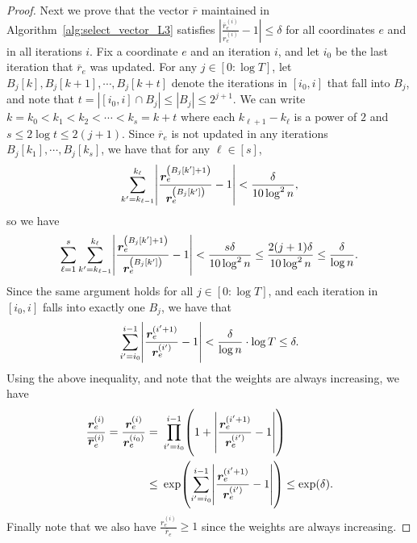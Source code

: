 \documentclass[11pt]{article}
\let\originalleft\left
\let\originalright\right
\renewcommand{\left}{\mathopen{}\mathclose\bgroup\originalleft}
\renewcommand{\right}{\aftergroup\egroup\originalright}
\newcommand\rr{\boldsymbol{\mathit{r}}}
\newcommand\rrbar{\overline{\boldsymbol{\mathit{r}}}}
\begin{document}
\begin{proof}
Next we prove that the vector $\rrbar$ maintained in Algorithm~\ref{alg:select_vector_L3} satisfies $|\frac{\rrbar^{(i)}_e}{\rr_e^{(i)}} - 1| \leq \delta$ for all coordinates $e$ and in all iterations $i$. Fix a coordinate $e$ and an iteration $i$, and let $i_0$ be the last iteration that $\rrbar_e$ was updated. For any $j \in [0:\log T]$, let $B_j[k], B_j[k+1], \cdots, B_j[k+t]$ denote the iterations in $[i_0, i]$ that fall into $B_j$, and note that $t = |[i_0,i] \cap B_j| \leq |B_j| \leq 2^{j+1}$. We can write $k = k_0 < k_1 < k_2 < \cdots < k_s = k+t$ where each $k_{\ell+1} - k_{\ell}$ is a power of $2$ and $s \leq 2 \log t \leq 2 (j+1)$. Since $\rrbar_e$ is not updated in any iterations $B_j[k_1], \cdots, B_j[k_s]$, we have that for any $\ell \in [s]$,
\begin{align*}
\sum_{k' = k_{\ell-1}}^{k_{\ell}} \left|\frac{\rr_e^{\left(B_j[k'] + 1\right)}}{\rr_e^{\left(B_j[k'] \right)}} - 1 \right| < \frac{\delta}{10 \log^2 n},
\end{align*}
so we have
\begin{align*}
\sum_{\ell=1}^{s} \sum_{k' = k_{\ell-1}}^{k_{\ell}} \left|\frac{\rr_e^{\left(B_j[k'] + 1\right)}}{\rr_e^{\left(B_j[k'] \right)}} - 1 \right| < \frac{s \delta}{10 \log^2 n} \leq \frac{2(j+1) \delta}{10 \log^2 n} \leq \frac{\delta}{\log n}.
\end{align*}
Since the same argument holds for all $j \in [0: \log T]$, and each iteration in $[i_0, i]$ falls into exactly one $B_j$, we have that
\begin{align*}
\sum_{i'=i_0}^{i-1} \left|\frac{\rr_e^{(i'+1)}}{\rr_e^{(i')}} - 1 \right| < \frac{\delta}{\log n} \cdot \log T \leq \delta.
\end{align*}
Using the above inequality, and note that the weights are always increasing, we have
\begin{align*}
\frac{\rr_e^{(i)}}{\rrbar^{(i)}_e} = \frac{\rr_e^{(i)}}{\rr_e^{(i_0)}}
= &~ \prod_{i'=i_0}^{i-1} \left( 1 + \left|\frac{\rr_e^{(i'+1)}}{\rr_e^{(i')}} - 1 \right| \right) \\
\leq &~ \exp\left( \sum_{i'=i_0}^{i-1} \left|\frac{\rr_e^{(i'+1)}}{\rr_e^{(i')}} - 1 \right| \right) \leq \exp(\delta).
\end{align*}
Finally note that we also have $\frac{\rr_e^{(i)}}{\rrbar_e} \geq 1$ since the weights are always increasing.
\end{proof}
\end{document}
